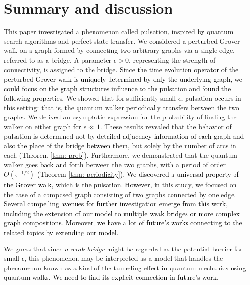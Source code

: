 \documentclass[12pt]{article}
\numberwithin{lemma}{section}
\numberwithin{proposition}{section}
\numberwithin{remark}{section}
\numberwithin{definition}{section}
\newcommand{\red}{\textcolor{black}}
\begin{document}
\section{Summary and discussion}
This paper \red{investigated} a phenomenon called pulsation, inspired by quantum search algorithms and perfect state transfer. We considered \red{a perturbed} Grover walk on a graph formed by connecting two arbitrary graphs via a single edge, referred to as a bridge. A parameter $\epsilon > 0$, representing the strength of connectivity, is assigned to the bridge.
\red{Since the time evolution operator of the perturbed Grover walk is uniquely determined by only the underlying graph, we could focus on the graph structures influence to the pulsation and found the following properties. }
We showed that for sufficiently small $\epsilon$, pulsation \red{occurs} in this setting: that is, the quantum walker periodically transfers between the two graphs. We derived an asymptotic expression for the probability of finding the walker on either graph \red{for $\epsilon \ll 1$}. These results revealed that the behavior of pulsation is determined not by \red{detailed adjacency information of each graph and also the place of the bridge between them}, but solely by the number of arcs in each \red{(Theorem \ref{thm: prob})}.
Furthermore, we demonstrated that the quantum walker goes back and forth between the two graphs, with a period of order $O(\epsilon^{-1/2})$ \red{(Theorem \ref{thm: periodicity})}.
\red{We discovered a universal property of the Grover walk, which is the pulsation. }
\red{However}, in this study, we focused on the case of a composed graph consisting of two graphs connected by one edge. 
\red{Several compelling avenues for further investigation emerge from this work, including the extension of our model to multiple weak bridges or more complex graph compositions.}
\red{Moreover, we have a lot of future's works connecting to the related topics by extending our model.} 

We guess that since {\it a \red{weak} bridge} might be regarded as the potential barrier for \red{small $\epsilon$}, this phenomenon may be interpreted as a model that handles the phenomenon known as a kind of the tunneling effect \cite{B,DH} in quantum mechanics using quantum walks. \red{We need to find its explicit connection in future's work. }
\end{document}
